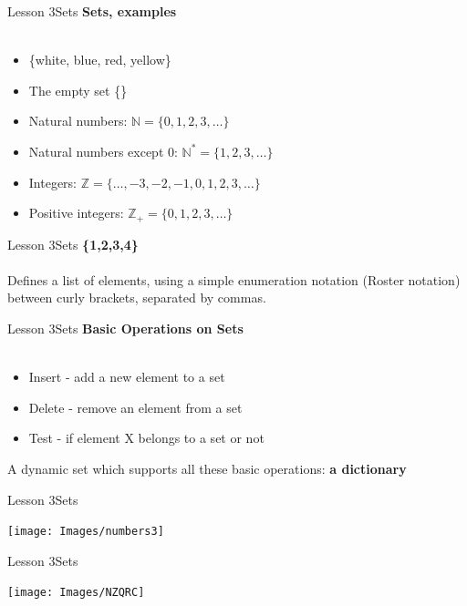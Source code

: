 \documentclass[aspectratio=1610]{beamer}
\begin{document}
\begin{frame}{Lesson 3}{Sets}
\LARGE
\textbf{Sets, examples}\\~\\
\begin{itemize}
    \item \{white, blue, red, yellow\}
    \item The empty set \{\}
    \item Natural numbers: $\mathbb{N} = \{0, 1, 2, 3, \ldots\}$
    \item Natural numbers except 0: $\mathbb{N^*} = \{1, 2, 3, \ldots\}$
    \item Integers: $\mathbb{Z} = \{\ldots, -3, -2, -1, 0, 1, 2, 3, \ldots\}$
    \item Positive integers: $\mathbb{Z_+} = \{0, 1, 2, 3, \ldots\}$
\end{itemize}
\end{frame}



\begin{frame}{Lesson 3}{Sets}
\LARGE{\textbf{\{1,2,3,4\}}}\\~\\
\LARGE
Defines a list of elements, using a simple enumeration notation (Roster notation) between curly brackets, separated by commas.
\end{frame}


\begin{frame}{Lesson 3}{Sets}
\LARGE
\textbf{Basic Operations on Sets}\\~\\
\begin{itemize}
    \item Insert - add a new element to a set
    \item Delete - remove an element from a set
    \item Test - if element X belongs to a set or not 
\end{itemize}

A dynamic set which supports all these basic operations: \textbf{a dictionary} 
\end{frame}


\begin{frame}{Lesson 3}{Sets}
\begin{center}
\texttt{[image: Images/numbers3]}
\end{center}
\end{frame}


\begin{frame}{Lesson 3}{Sets}
\begin{center}
\texttt{[image: Images/NZQRC]}
\end{center}
\end{frame}
\end{document}
